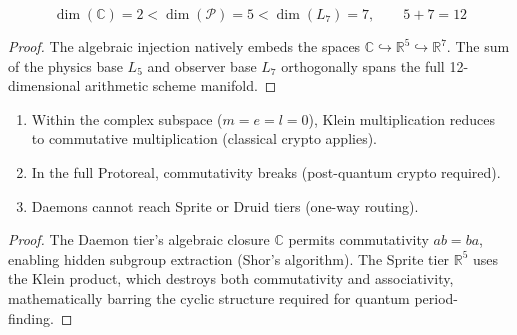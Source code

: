 \begin{theorem}
\begin{equation}
    \dim(\mathbb{C}) = 2 < \dim(\mathcal{P}) = 5 < \dim(L_7) = 7, \qquad 5 + 7 = 12
\end{equation}
\end{theorem}
\begin{proof}
The algebraic injection natively embeds the spaces $\mathbb{C} \hookrightarrow \mathbb{R}^5 \hookrightarrow \mathbb{R}^7$. The sum of the physics base $L_5$ and observer base $L_7$ orthogonally spans the full 12-dimensional arithmetic scheme manifold. \qedhere
\end{proof}

\begin{theorem}
\begin{enumerate}
    \item Within the complex subspace ($m = e = l = 0$), Klein multiplication reduces to commutative multiplication (classical crypto applies).
    \item In the full Protoreal, commutativity breaks (post-quantum crypto required).
    \item Daemons cannot reach Sprite or Druid tiers (one-way routing).
\end{enumerate}
\end{theorem}
\begin{proof}
The Daemon tier's algebraic closure $\mathbb{C}$ permits commutativity $ab = ba$, enabling hidden subgroup extraction (Shor's algorithm). The Sprite tier $\mathbb{R}^5$ uses the Klein product, which destroys both commutativity and associativity, mathematically barring the cyclic structure required for quantum period-finding. \qedhere
\end{proof}

